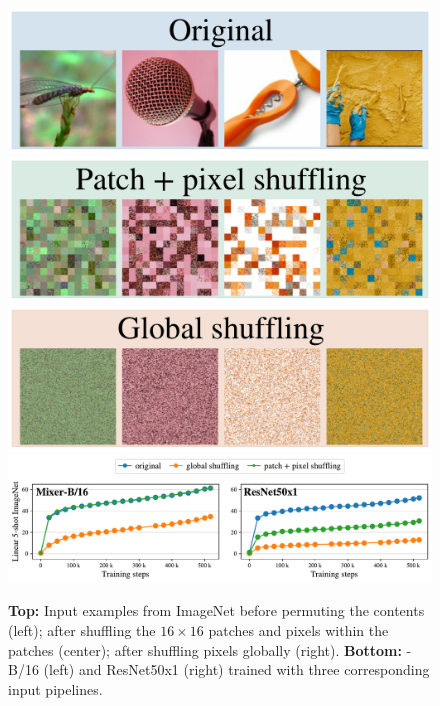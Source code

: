\begin{figure}[tb]
\centering
\includegraphics[width=.27\linewidth]{pics/imagenet_original.pdf}
\includegraphics[width=.27\linewidth]{pics/imagenet_shuffled_patches_16x16.pdf}
\includegraphics[width=.27\linewidth]{pics/imagenet_shuffled_global_16x16.pdf}\vspace{.15cm}\\
\includegraphics[width=.8\linewidth]{pics/shuffle.pdf}
\vspace{-.2cm}
\caption{
    {\bf Top:} 
    Input examples from ImageNet before permuting the contents (left);
    after shuffling the $16\times 16$ patches and pixels within the patches (center);
    after shuffling pixels globally (right).
    {\bf Bottom:}  
    \name{}-B/16 (left) and ResNet50x1 (right) trained with three corresponding input pipelines.
}
\label{fig:input-pp-ablation}
\end{figure}

